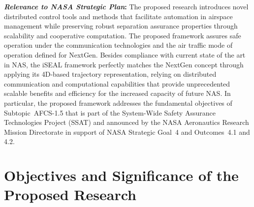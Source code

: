 \documentclass[letter,onecolumn,12pt]{aiaa-tc}
\begin{document}
\textbf{\emph{Relevance to NASA Strategic Plan}:} The proposed research introduces novel distributed control tools and methods that facilitate automation in airspace management while preserving robust separation assurance properties through scalability and cooperative computation. The proposed framework  assures safe operation under the communication technologies  and the air traffic mode of operation defined for NextGen. Besides compliance with current state of the art in NAS, the iSEAL framework perfectly matches the NextGen concept through applying its 4D-based trajectory representation, relying on distributed communication and computational capabilities that provide unprecedented scalable benefits and efficiency for the increased capacity of future NAS. 
In particular, the proposed framework addresses the fundamental objectives of Subtopic~\mbox{AFCS-1.5} that is part of the System-Wide Safety Assurance Technologies Project (SSAT) and announced by the NASA Aeronautics Research Mission Directorate in support of NASA Strategic Goal~4 and Outcomes~4.1 and 4.2.

\section{Objectives and Significance of the Proposed Research}
\end{document}
